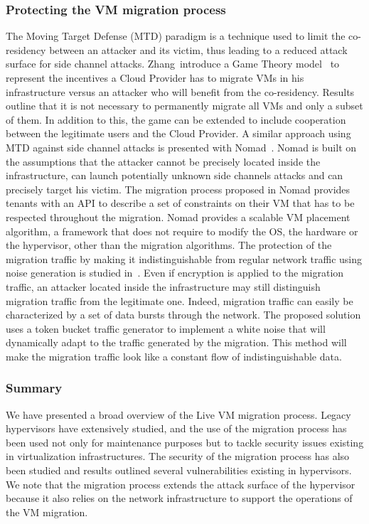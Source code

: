 \subsubsection{Protecting the VM migration process}
The Moving Target Defense (MTD) paradigm is a technique used to limit the co-residency between an attacker and its victim, thus leading to a reduced attack surface for side channel attacks.
Zhang~\etal introduce a Game Theory model~\cite{incentivemtd-Zhang2012} to represent the incentives a Cloud Provider has to migrate VMs in his infrastructure versus an attacker who will benefit from the co-residency. Results outline that it is not necessary to permanently migrate all VMs and only a subset of them. In addition to this, the game can be extended to include cooperation between the legitimate users and the Cloud Provider.
A similar approach using MTD against side channel attacks is presented with Nomad~\cite{nomad-Moon2015b}. Nomad is built on the assumptions that the attacker cannot be precisely located inside the infrastructure, can launch potentially unknown side channels attacks and can precisely target his victim. 
The migration process proposed in Nomad provides tenants with an API to describe a set of constraints on their VM that has to be respected throughout the migration.
Nomad provides a scalable VM placement algorithm, a framework that does not require to modify the OS, the hardware or the hypervisor, other than the migration algorithms.
The protection of the migration traffic by making it indistinguishable from regular network traffic using noise generation is studied in~\cite{stealth-Achleitner2017a}. Even if encryption is applied to the migration traffic, an attacker located inside the infrastructure may still distinguish migration traffic from the legitimate one. Indeed, migration traffic can easily be characterized by a set of data bursts through the network. The proposed solution uses a token bucket traffic generator to implement a white noise that will dynamically adapt to the traffic generated by the migration. This method will make the migration traffic look like a constant flow of indistinguishable data.

\subsubsection{Summary}
We have presented a broad overview of the Live VM migration process.
Legacy hypervisors have extensively studied, and the use of the migration process has been used not only for maintenance purposes but to tackle security issues existing in virtualization infrastructures.
The security of the migration process has also been studied and results outlined several vulnerabilities existing in hypervisors.
We note that the migration process extends the attack surface of the hypervisor because it also relies on the network infrastructure to support the operations of the VM migration.
